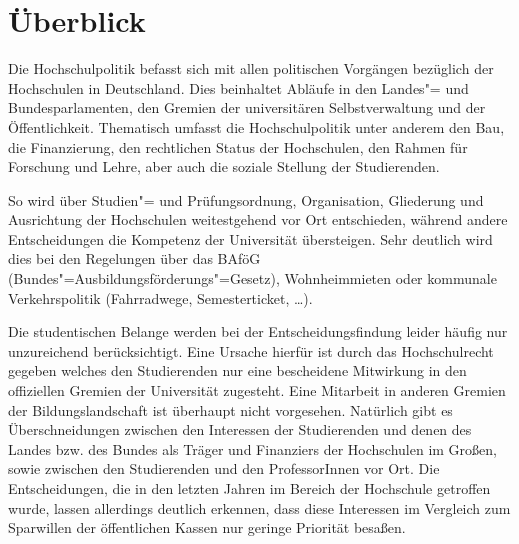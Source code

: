 \section{Überblick}
\label{hopo}

Die Hochschulpolitik befasst sich mit allen politischen Vorgängen
bezüglich der Hochschulen in Deutschland. Dies beinhaltet Abläufe in den
Landes"= und Bundesparlamenten, den Gremien der universitären
Selbstverwaltung und der Öffentlichkeit. Thematisch umfasst die
Hochschulpolitik unter anderem den Bau, die Finanzierung, den rechtlichen
Status der Hochschulen, den Rahmen für Forschung und Lehre, aber auch die
soziale Stellung der Studierenden.

So wird über Studien"= und Prüfungsordnung, Organisation, Gliederung und
Ausrichtung der Hochschulen weitestgehend vor Ort entschieden, während
andere Entscheidungen die Kompetenz der Universität übersteigen. Sehr
deutlich wird dies bei den Regelungen über das BAföG
(Bundes"=Ausbildungsförderungs"=Gesetz), Wohnheimmieten oder kommunale
Verkehrspolitik (Fahrradwege, Semesterticket, \dots).

Die studentischen Belange werden bei der Entscheidungsfindung leider
häufig nur unzureichend berücksichtigt. Eine Ursache hierfür ist durch das
Hochschulrecht gegeben welches den Studierenden nur eine bescheidene
Mitwirkung in den offiziellen Gremien der Universität zugesteht. Eine
Mitarbeit in anderen Gremien der Bildungslandschaft ist überhaupt nicht
vorgesehen. Natürlich gibt es Überschneidungen zwischen den Interessen der
Studierenden und denen des Landes bzw. des Bundes als Träger und
Finanziers der Hochschulen im Großen, sowie zwischen den Studierenden und
den ProfessorInnen vor Ort. Die Entscheidungen, die in den letzten Jahren im
Bereich der Hochschule getroffen wurde, lassen allerdings deutlich
erkennen, dass diese Interessen im Vergleich zum Sparwillen der
öffentlichen Kassen nur geringe Priorität besaßen.

